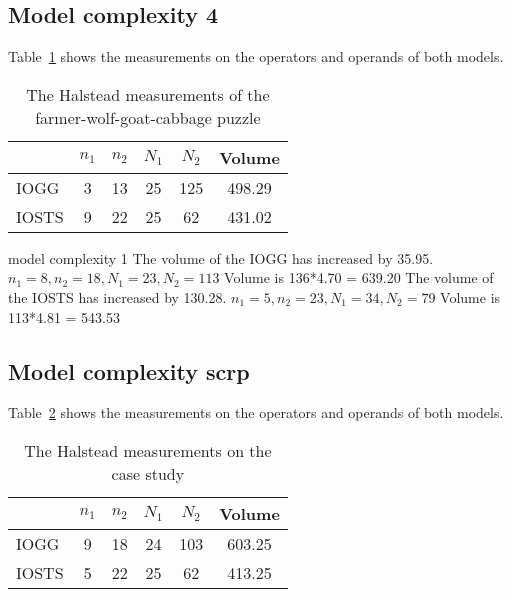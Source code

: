 \subsection{Model complexity 4}
\begin{comment}
start: 1 - 25. 13 - 46
?o: 1 - 2. 1 - 14
!po: 2 - 3. 4 - 24
?p: 0 - 0. 3 - 18
!pp: 3 - 
\end{comment}

Table~\ref{tab:halstead-bartab} shows the measurements on the operators and operands of both models.

\begin{table}[ht]
\begin{center}
\begin{tabular}{| l | c | c | c | c | c |}
  \hline
  & $n_1$ & $n_2$ & $N_1$ & $N_2$ & Volume \\ \hline
  IOGG & 3 & 13 & 25 & 125 & 498.29 \\ \hline
  IOSTS & 9 & 22 & 25 & 62 & 431.02 \\
  \hline
\end{tabular}
\end{center}
\caption{The Halstead measurements of the farmer-wolf-goat-cabbage puzzle}
\label{tab:halstead-bartab}
\end{table}

model complexity 1
The volume of the IOGG has increased by 35.95. $n_1 = 8, n_2 = 18, N_1 = 23, N_2 = 113$ Volume is 136*4.70 = 639.20
The volume of the IOSTS has increased by 130.28. $n_1 = 5, n_2 = 23, N_1 = 34, N_2 = 79$ Volume is 113*4.81 = 543.53

\subsection{Model complexity scrp}
\begin{comment}
start:
\end{comment}

Table~\ref{tab:halstead-scrp} shows the measurements on the operators and operands of both models.

\begin{table}[ht]
\begin{center}
\begin{tabular}{| l | c | c | c | c | c |}
  \hline
  & $n_1$ & $n_2$ & $N_1$ & $N_2$ & Volume \\ \hline
  IOGG & 9 & 18 & 24 & 103 & 603.25 \\ \hline
  IOSTS & 5 & 22 & 25 & 62 & 413.25 \\
  \hline
\end{tabular}
\end{center}
\caption{The Halstead measurements on the case study}
\label{tab:halstead-scrp}
\end{table}

